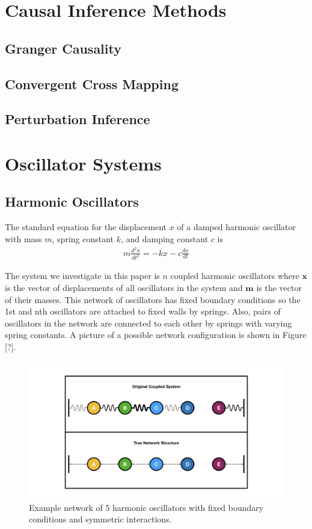 \documentclass[]{article}
\begin{document}
\section{Causal Inference Methods}
\subsection{Granger Causality}

\subsection{Convergent Cross Mapping}

\subsection{Perturbation Inference}


\section{Oscillator Systems}
\subsection{Harmonic Oscillators}
The standard equation for the displacement $x$ of a damped harmonic oscillator with mass $m$, spring constant $k$, and damping constant $c$ is
\begin{align*}
m\frac{d^2x}{dt^2} = -kx - c\frac{dx}{dt}
\end{align*}

The system we investigate in this paper is $n$ coupled harmonic oscillators where $\mathbf{x}$ is the vector of displacements of all oscillators in the system and $\mathbf{m}$ is the vector of their masses. This network of oscillators has fixed boundary conditions so the 1st and nth oscillators are attached to fixed walls by springs. Also, pairs of oscillators in the network are connected to each other by springs with varying spring constants. A picture of a possible network configuration is shown in Figure [?].

\begin{figure}
    \centering
    \includegraphics[width=14cm]{ExampleNetwork.jpeg}
    \caption{Example network of 5 harmonic oscillators with fixed boundary conditions and symmetric interactions.}
    \label{fig:example}
\end{figure}
\end{document}
